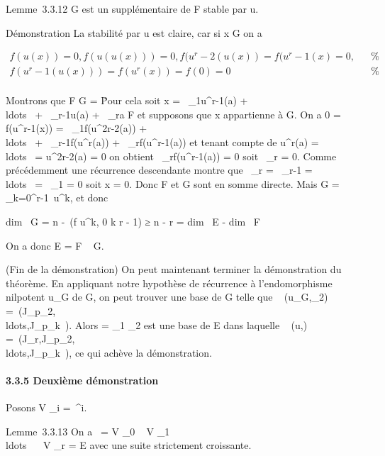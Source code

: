 \documentclass[]{article}
\begin{document}
Lemme~3.3.12 G est un supplémentaire de F stable par u.

Démonstration La stabilité par u est claire, car si x \in G on a

\begin{align*} f(u(x)) = 0,f(u(u(x))) =
0,f(u^r-2(u(x)) = f(u^r-1(x) = 0,& & \%&
\\ f(u^r-1(u(x))) =
f(u^r(x)) = f(0) = 0& & \%&
\\ \end{align*}

Montrons que F \bigcap G = \0\. Pour cela
soit x = \lambda~\_1u^r-1(a) +
\\ldots~ +
\lambda~\_r-1u(a) + \lambda~\_ra \in F et supposons que x appartienne à
G. On a 0 = f(u^r-1(x)) = \lambda~\_1f(u^2r-2(a))
+ \\ldots~ +
\lambda~\_r-1f(u^r(a)) + \lambda~\_rf(u^r-1(a))
et tenant compte de u^r(a) =
\\ldots~ =
u^2r-2(a) = 0 on obtient \lambda~\_rf(u^r-1(a)) =
0 soit \lambda~\_r = 0. Comme précédemment une récurrence descendante
montre que \lambda~\_r = \lambda~\_r-1 =
\\ldots~ =
\lambda~\_1 = 0 soit x = 0. Donc F et G sont en somme directe. Mais G =
\bigcap\_k=0^r-1\
\mathrmKerf \cdot u^k, et donc

dim~ G = n
-\mathrmrg~(f \cdot
u^k, 0 \leq k \leq r - 1) ≥ n - r = dim~ E
- dim~ F

On a donc E = F \oplus~ G.

(Fin de la démonstration) On peut maintenant terminer la démonstration
du théorème. En appliquant notre hypothèse de récurrence à
l'endomorphisme nilpotent u\textbar{}\_G de G, on peut trouver
une base de G telle que
\mathrmMat~
(u\textbar{}\_G,\_2) =\
\mathrmdiag(J\_p\_2,\\ldots,J\_p\_k~).
Alors  = \mathcal{E}\_1 \cup{}\_2 est une base de E dans laquelle
\mathrmMat~ (u,\mathcal{E})
=\
\mathrmdiag(J\_r,J\_p\_2,\\ldots,J\_p\_k~),
ce qui achève la démonstration.

\paragraph{3.3.5 Deuxième démonstration}

Posons V \_i =\
\mathrmKeru^i.

Lemme~3.3.13 On a \0\ = V \_0
\subset~ V \_1
\subset~\\ldots~ \subset~ V
\_r = E avec une suite strictement croissante.
\end{document}
